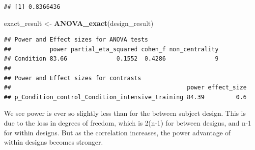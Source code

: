 \documentclass[]{book}
\newenvironment{Shaded}{\begin{snugshade}}{\end{snugshade}}
\newcommand{\CommentTok}[1]{\textcolor[rgb]{0.56,0.35,0.01}{\textit{#1}}}
\newcommand{\DataTypeTok}[1]{\textcolor[rgb]{0.13,0.29,0.53}{#1}}
\newcommand{\DecValTok}[1]{\textcolor[rgb]{0.00,0.00,0.81}{#1}}
\newcommand{\KeywordTok}[1]{\textcolor[rgb]{0.13,0.29,0.53}{\textbf{#1}}}
\newcommand{\NormalTok}[1]{#1}
\newcommand{\OperatorTok}[1]{\textcolor[rgb]{0.81,0.36,0.00}{\textbf{#1}}}
\newcommand{\StringTok}[1]{\textcolor[rgb]{0.31,0.60,0.02}{#1}}
\begin{document}
\begin{verbatim}
## [1] 0.8366436
\end{verbatim}

\begin{Shaded}
\begin{Highlighting}[]
\NormalTok{exact_result <-}\StringTok{ }\KeywordTok{ANOVA_exact}\NormalTok{(design_result)}
\end{Highlighting}
\end{Shaded}

\begin{verbatim}
## Power and Effect sizes for ANOVA tests
##           power partial_eta_squared cohen_f non_centrality
## Condition 83.66              0.1552  0.4286              9
## 
## Power and Effect sizes for contrasts
##                                                  power effect_size
## p_Condition_control_Condition_intensive_training 84.39         0.6
\end{verbatim}

We see power is ever so slightly less than for the between subject design. This is due to the loss in degrees of freedom, which is 2(n-1) for between designs, and n-1 for within designs. But as the correlation increases, the power advantage of within designs becomes stronger.

\begin{Shaded}
\end{Shaded}
\end{document}

